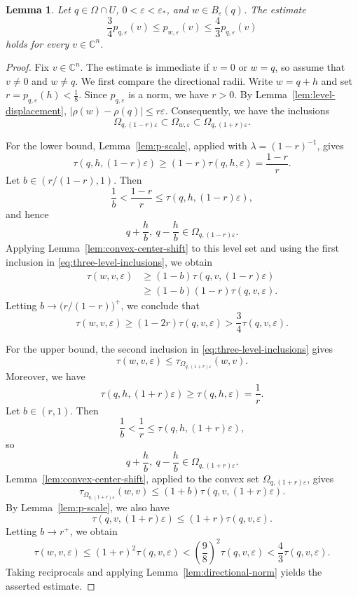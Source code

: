 \documentclass[11pt]{article}
\newtheorem{lemma}[theorem]{Lemma}
\theoremstyle{definition}
\newcommand{\C}{\mathbb{C}}
\newcommand{\eps}{\varepsilon}
\begin{document}
\begin{lemma}\label{lem:center-stability}
    Let \(q\in\Omega\cap U\), \(0<\eps<\eps_*\), and
    \(w\in B_\eps(q)\).  The estimate
    \begin{equation*}
        \frac34p_{q,\eps}(v)
        \le
        p_{w,\eps}(v)
        \le
        \frac43p_{q,\eps}(v)
    \end{equation*}
    holds for every \(v\in\C^n\).
\end{lemma}
\begin{proof}
Fix \(v\in\C^n\).  The estimate is immediate if \(v=0\) or \(w=q\),
so assume that \(v\ne0\) and \(w\ne q\).  We first compare the
directional radii. Write \(w=q+h\) and set
\(r=p_{q,\eps}(h)<\frac18\).
Since \(p_{q,\eps}\) is a norm, we have \(r>0\).  By
Lemma~\ref{lem:level-displacement},
\(|\rho(w)-\rho(q)|\le r\eps\).
Consequently, we have the inclusions
\begin{equation}\label{eq:three-level-inclusions}
\Omega_{q,(1-r)\eps}
\subset
\Omega_{w,\eps}
\subset
\Omega_{q,(1+r)\eps}.
\end{equation}

For the lower bound, Lemma~\ref{lem:p-scale}, applied with
\(\lambda=(1-r)^{-1}\), gives
\[
\tau(q,h,(1-r)\eps)
\ge
(1-r)\tau(q,h,\eps)
=
\frac{1-r}{r}.
\]
Let \(b\in(r/(1-r),1)\).  Then
\[
\frac1b
<
\frac{1-r}{r}
\le
\tau(q,h,(1-r)\eps),
\]
and hence
\[
q+\frac{h}{b},\ q-\frac{h}{b}
\in
\Omega_{q,(1-r)\eps}.
\]
Applying Lemma~\ref{lem:convex-center-shift} to this level set and using
the first inclusion in \eqref{eq:three-level-inclusions}, we obtain
\[
\begin{aligned}
\tau(w,v,\eps)
&\ge
(1-b)\tau(q,v,(1-r)\eps)\\
&\ge
(1-b)(1-r)\tau(q,v,\eps).
\end{aligned}
\]
Letting \(b\to\bigl(r/(1-r)\bigr)^+\), we conclude that
\[
\tau(w,v,\eps)
\ge
(1-2r)\tau(q,v,\eps)
>
\frac34\tau(q,v,\eps).
\]

For the upper bound, the second inclusion in
\eqref{eq:three-level-inclusions} gives
\[
\tau(w,v,\eps)
\le
\tau_{\Omega_{q,(1+r)\eps}}(w,v).
\]
Moreover, we have
\[
\tau(q,h,(1+r)\eps)
\ge
\tau(q,h,\eps)
=
\frac1r.
\]
Let \(b\in(r,1)\).  Then
\[
\frac1b
<
\frac1r
\le
\tau(q,h,(1+r)\eps),
\]
so
\[
q+\frac{h}{b},\ q-\frac{h}{b}
\in
\Omega_{q,(1+r)\eps}.
\]
Lemma~\ref{lem:convex-center-shift}, applied to the convex set
\(\Omega_{q,(1+r)\eps}\), gives
\[
\tau_{\Omega_{q,(1+r)\eps}}(w,v)
\le
(1+b)\tau(q,v,(1+r)\eps).
\]
By Lemma~\ref{lem:p-scale}, we also have
\[
\tau(q,v,(1+r)\eps)
\le
(1+r)\tau(q,v,\eps).
\]
Letting \(b\to r^+\), we obtain
\[
\tau(w,v,\eps)
\le
(1+r)^2\tau(q,v,\eps)
<
\left(\frac98\right)^2\tau(q,v,\eps)
<
\frac43\tau(q,v,\eps).
\]
Taking reciprocals and applying Lemma~\ref{lem:directional-norm}
yields the asserted estimate.
\end{proof}
\end{document}
